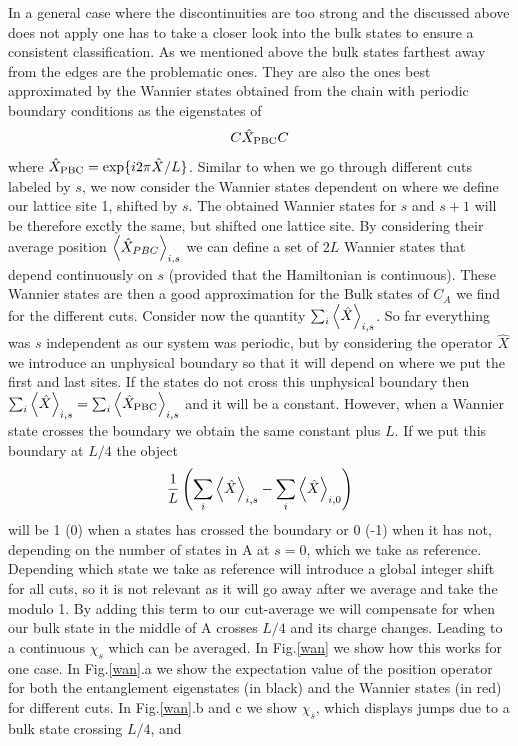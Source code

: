 \documentclass[twocolumn,amsmath,longbibliography,amssymb,superscriptaddress]{revtex4-1}
\begin{document}
In a general case where the discontinuities are too strong and the discussed above does not apply one has to take a closer look into the bulk states to ensure a consistent classification. As we mentioned above the bulk states farthest away from the edges are the problematic ones. They are also the ones best approximated by the Wannier states obtained from the chain with periodic boundary conditions as the eigenstates of 
\begin{equation}
C\hat{X}_{\rm PBC}C
\end{equation}
where $\hat{X}_{\rm PBC} = \exp\{i 2\pi \hat{X}/L\}$. Similar to when we go through different cuts labeled by $s$, we now consider the Wannier states dependent on where we define our lattice site 1, shifted by $s$. The obtained Wannier states for $s$ and $s+1$ will be therefore exctly the same, but shifted one lattice site. By considering their average position $\expval{\hat{X}_{PBC}}_{i,s}$ we can define a set of $2L$ Wannier states that depend continuously on $s$ (provided that the Hamiltonian is continuous). These Wannier states are then a good approximation for the Bulk states of $C_A$ we find for the different cuts. Consider now the quantity $\sum_i\expval{\hat{X}}_{i,s}$. So far everything was $s$ independent as our system was periodic, but by considering the operator $\hat{X}$ we introduce an unphysical boundary so that it will depend on where we put the first and last sites. If the states do not cross this unphysical boundary then $\sum_i\expval{\hat{X}}_{i,s} = \sum_i\expval{\hat{X}_{\rm PBC}}_{i,s} $ and it will be a constant. However, when a Wannier state crosses the boundary we obtain the same constant plus $L$. If we put this boundary at $L/4$ the object 
\begin{equation}
\frac{1}{L}\left(\sum_i\expval{\hat{X}}_{i,s}-\sum_i\expval{\hat{X}}_{i,0}\right)
\end{equation}
will be 1 (0) when a states has crossed the boundary or 0 (-1) when it has not, depending on the number of states in A at $s=0$, which we take as reference. Depending which state we take as reference will introduce a global integer shift for all cuts, so it is not relevant as it will go away after we average and take the modulo 1. By adding this term to our cut-average we will compensate for when our bulk state in the middle of A crosses $L/4$ and its charge changes. Leading to a continuous $\chi_s$ which can be averaged. In Fig.\ref{wan} we show how this works for one case. In Fig.\ref{wan}.a we show the expectation value of the position operator for both the entanglement eigenstates (in black) and the Wannier states (in red) for different cuts. In Fig.\ref{wan}.b and c we show $\chi_s$, which displays jumps due to a bulk state crossing $L/4$, and 
\end{document}

